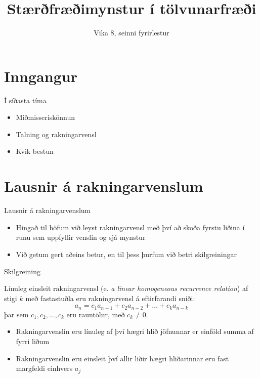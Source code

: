 \documentclass[handout]{beamer}
\title{Stærðfræðimynstur í tölvunarfræði}
\subtitle{Vika 8, seinni fyrirlestur}
\begin{document}
\begin{frame}
\titlepage
\end{frame}


\section{Inngangur}

\begin{frame}{Í síðasta tíma}
\begin{itemize}
 \item Miðmisseriskönnun
 \item Talning og rakningarvensl
 \item Kvik bestun
\end{itemize}
\end{frame}

\section{Lausnir á rakningarvenslum}

\begin{frame}{Lausnir á rakningarvenslum}
\begin{itemize}
 \item Hingað til höfum við leyst rakningarvensl með því að skoða fyrstu liðina í runu sem uppfyllir venslin og sjá mynstur
 \item Við getum gert aðeins betur, en til þess þurfum við betri skilgreiningar
\end{itemize}
\end{frame}

\begin{frame}{Skilgreining}
\begin{tcolorbox}[title=Línuleg einsleit rakningarvensl með fastastuðlum]
Línuleg einsleit rakningarvensl (e. \emph{a linear homogeneous recurrence relation}) af stigi $k$ með fastastuðla eru rakningarvensl á eftirfarandi sniði:
\[
 a_n = c_1 a_{n-1} + c_2a_{n-2} + \ldots + c_ka_{n-k}
\]
þar sem $c_1, c_2, \ldots, c_k$ eru rauntölur, með $c_k \neq 0$.
\end{tcolorbox}
\begin{itemize}
 \item Rakningarvenslin eru línuleg af því hægri hlið jöfnunnar er einföld summa af fyrri liðum
 \item Rakningarvenslin eru einsleit því allir liðir hægri hliðarinnar eru fast margfeldi einhvers $a_j$
\end{itemize}
\end{frame}
\end{document}
